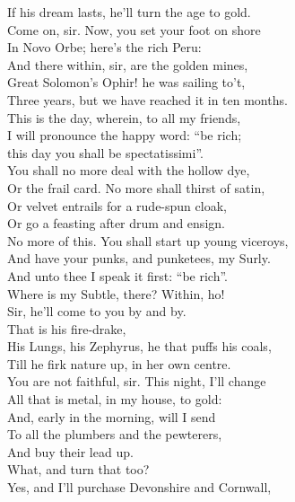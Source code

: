 \documentclass[a4paper,oneside,12pt]{memoir}
\begin{document}
\begin{drama*}
If his dream lasts, he'll turn the age to gold.\\
\mammonspeaks Come on, sir. Now, you set your foot on shore\\
In Novo Orbe; here's the rich Peru:\\
And there within, sir, are the golden mines,\\
Great Solomon's Ophir! he was sailing to't,\\
Three years, but we have reached it in ten months.\\
This is the day, wherein, to all my friends,\\
I will pronounce the happy word: ``be rich;\\
this day you shall be spectatissimi''.\\
You shall no more deal with the hollow dye,\\
Or the frail card. No more shall thirst of satin,\\
Or velvet entrails for a rude-spun cloak,\\
Or go a feasting after drum and ensign.\\
No more of this. You shall start up young viceroys,\\
And have your punks, and punketees, my Surly.\\
And unto thee I speak it first: ``be rich''.\\
Where is my Subtle, there? Within, ho!\\
\facespeaks {} Sir, he'll come to you by and by.\\
\mammonspeaks {} That is his fire-drake,\\
His Lungs, his Zephyrus, he that puffs his coals,\\
Till he firk nature up, in her own centre.\\
You are not faithful, sir. This night, I'll change\\
All that is metal, in my house, to gold:\\
And, early in the morning, will I send\\
To all the plumbers and the pewterers,\\
And buy their lead up.\\
\surlyspeaks {} What, and turn that too?\\
\mammonspeaks Yes, and I'll purchase Devonshire and Cornwall,\\

\end{drama*}
\end{document}
